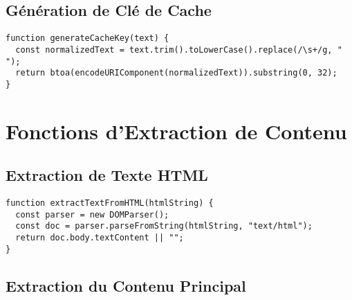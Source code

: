 \documentclass[12pt,a4paper]{article}
\begin{document}
\subsection{Génération de Clé de Cache}

\begin{lstlisting}
function generateCacheKey(text) {
  const normalizedText = text.trim().toLowerCase().replace(/\s+/g, " ");
  return btoa(encodeURIComponent(normalizedText)).substring(0, 32);
}
\end{lstlisting}

\section{Fonctions d'Extraction de Contenu}

\subsection{Extraction de Texte HTML}

\begin{lstlisting}
function extractTextFromHTML(htmlString) {
  const parser = new DOMParser();
  const doc = parser.parseFromString(htmlString, "text/html");
  return doc.body.textContent || "";
}
\end{lstlisting}

\subsection{Extraction du Contenu Principal}
\end{document}

